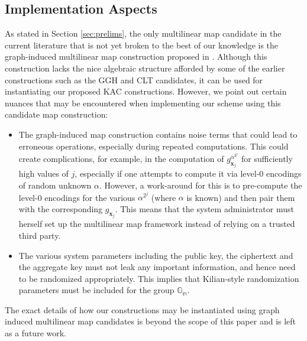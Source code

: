 \subsection{Implementation Aspects} 
\label{subsec:implementation}

As stated in Section \ref{sec:prelims}, the only multilinear map candidate in the current literature that is not yet broken to the best of our knowledge is the graph-induced multilinear map construction proposed in \cite{gentry2015graph}. Although this construction lacks the nice algebraic structure afforded by some of the earlier constructions such as the GGH \cite{garg2013candidate} and CLT \cite{coron2013practical} candidates, it can be used for instantiating our proposed KAC constructions. However, we point out certain nuances that may be encountered when implementing our scheme using this candidate map construction:

\begin{itemize}
 \item The graph-induced map construction contains noise terms that could lead to erroneous operations, especially during repeated computations. This could create complications, for example, in the computation of $g^{\alpha^{2^j}}_{\mathbf{x}_j}$ for sufficiently high values of $j$, especially if one attempts to compute it via level-0 encodings of random unknown $\alpha$. However, a work-around for this is to pre-compute the level-0 encodings for the various $\alpha^{2^j}$ (where $\alpha$ is known) and then pair them with the corresponding $g_{\mathbf{x}_j}$. This means that the system administrator must herself set up the multilinear map framework instead of relying on a trusted third party. \\
 
 \item The various system parameters including the public key, the ciphertext and the aggregate key must not leak any important information, and hence need to be randomized appropriately. This implies that Kilian-style randomization parameters must be included for the group $\mathbb{G}_{\mathbb{m}}$.
\end{itemize}

\noindent The exact details of how our constructions may be instantiated using graph induced multilinear map candidates is beyond the scope of this paper and is left as a future work.


